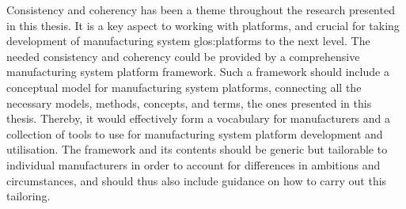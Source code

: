 Consistency and coherency has been a theme throughout the research presented in this thesis.
It is a key aspect to working with platforms, and crucial for taking development of manufacturing system \gls{glos:platform}s to the next level.
The needed consistency and coherency could be provided by a comprehensive manufacturing system platform framework.
Such a framework should include a conceptual model for manufacturing system platforms, connecting all the necessary models, methods, concepts, and terms, \eg{} the ones presented in this thesis.
Thereby, it would effectively form a vocabulary for manufacturers and a collection of tools to use for manufacturing system platform development and utilisation.
The framework and its contents should be generic but tailorable to individual manufacturers in order to account for differences in ambitions and circumstances, and should thus also include guidance on how to carry out this tailoring.